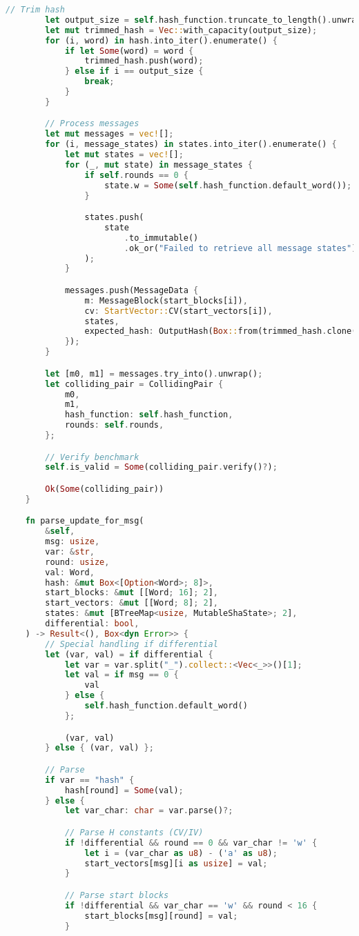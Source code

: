 \begin{lstlisting}[language=rust, caption={structs/benchmark.rs}]
		// Trim hash
		let output_size = self.hash_function.truncate_to_length().unwrap_or(8);
		let mut trimmed_hash = Vec::with_capacity(output_size);
		for (i, word) in hash.into_iter().enumerate() {
			if let Some(word) = word {
				trimmed_hash.push(word);
			} else if i == output_size {
				break;
			}
		}

		// Process messages
		let mut messages = vec![];
		for (i, message_states) in states.into_iter().enumerate() {
			let mut states = vec![];
			for (_, mut state) in message_states {
				if self.rounds == 0 {
					state.w = Some(self.hash_function.default_word());
				}

				states.push(
					state
						.to_immutable()
						.ok_or("Failed to retrieve all message states")?
				);
			}

			messages.push(MessageData {
				m: MessageBlock(start_blocks[i]),
				cv: StartVector::CV(start_vectors[i]),
				states,
				expected_hash: OutputHash(Box::from(trimmed_hash.clone())),
			});
		}

		let [m0, m1] = messages.try_into().unwrap();
		let colliding_pair = CollidingPair {
			m0,
			m1,
			hash_function: self.hash_function,
			rounds: self.rounds,
		};

		// Verify benchmark
		self.is_valid = Some(colliding_pair.verify()?);

		Ok(Some(colliding_pair))
	}

	fn parse_update_for_msg(
		&self,
		msg: usize,
		var: &str,
		round: usize,
		val: Word,
		hash: &mut Box<[Option<Word>; 8]>,
		start_blocks: &mut [[Word; 16]; 2],
		start_vectors: &mut [[Word; 8]; 2],
		states: &mut [BTreeMap<usize, MutableShaState>; 2],
		differential: bool,
	) -> Result<(), Box<dyn Error>> {
		// Special handling if differential
		let (var, val) = if differential {
			let var = var.split("_").collect::<Vec<_>>()[1];
			let val = if msg == 0 {
				val
			} else {
				self.hash_function.default_word()
			};

			(var, val)
		} else { (var, val) };

		// Parse
		if var == "hash" {
			hash[round] = Some(val);
		} else {
			let var_char: char = var.parse()?;

			// Parse H constants (CV/IV)
			if !differential && round == 0 && var_char != 'w' {
				let i = (var_char as u8) - ('a' as u8);
				start_vectors[msg][i as usize] = val;
			}

			// Parse start blocks
			if !differential && var_char == 'w' && round < 16 {
				start_blocks[msg][round] = val;
			}


\end{lstlisting}
